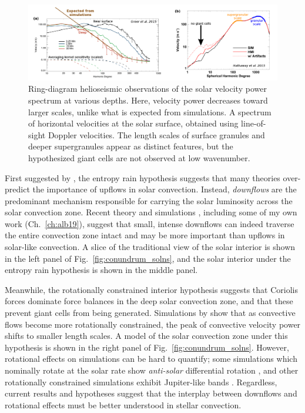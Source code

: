 \begin{figure}[t!]
\includegraphics[width=\textwidth]{./figs/intro/conv_conundrum.pdf}
\caption[The convective conundrum.]
{
	\citep[a, annoted Fig.~3 from][]{greer&all2015} Ring-diagram helioseismic observations of the solar velocity power spectrum at various depths.
	Here, velocity power decreases toward larger scales, unlike what is expected from simulations.
	\citep[b, annotated Fig.~8 from][]{hathaway&all2015} A spectrum of horizontal velocities at the solar surface, obtained using line-of-sight Doppler velocities.
	The length scales of surface granules and deeper supergranules appear as distinct features, but the hypothesized giant cells are not observed at low wavenumber.
	\label{fig:conv_conundrum} 
}
\end{figure}

First suggested by \cite{spruit1997}, the entropy rain hypothesis suggests that many theories over-predict the importance of upflows in solar convection.
Instead, \emph{downflows} are the predominant mechanism responsible for carrying the solar luminosity across the solar convection zone.
Recent theory and simulations \citep{brandenburg2016, kapyla&all2017}, including some of my own work (Ch.~\ref{ch:alb19}), suggest that small, intense downflows can indeed traverse the entire convection zone intact and may be more important than upflows in solar-like convection.
A slice of the traditional view of the solar interior is shown in the left panel of Fig.~\ref{fig:conundrum_solns}, and the solar interior under the entropy rain hypothesis is shown in the middle panel.

Meanwhile, the rotationally constrained interior hypothesis suggests that Coriolis forces dominate force balances in the deep solar convection zone, and that these prevent giant cells from being generated.
Simulations by \cite{featherstone&hindman2016a, featherstone&hindman2016b} show that as convective flows become more rotationally constrained, the peak of convective velocity power shifts to smaller length scales.
A model of the solar convection zone under this hypothesis is shown in the right panel of Fig.~\ref{fig:conundrum_solns}.
However, rotational effects on simulations can be hard to quantify; some simulations which nominally rotate at the solar rate show \emph{anti-solar} differential rotation \citep{gastine&all2014}, and other rotationally constrained simulations exhibit Jupiter-like bands \citep{brun&all2017}.
Regardless, current results and hypotheses suggest that the interplay between downflows and rotational effects must be better understood in stellar convection.

